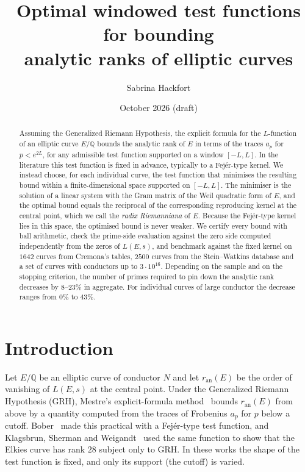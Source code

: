 \documentclass[11pt]{amsart}
\title[Optimal windowed test functions for analytic rank bounds]{Optimal windowed test functions for bounding\\ analytic ranks of elliptic curves}
\author{Sabrina Hackfort}
\date{October 2026 \quad (draft)}
\theoremstyle{remark}
\theoremstyle{definition}
\newcommand{\Q}{\mathbb{Q}}
\newcommand{\ran}{r_{\mathrm{an}}}
\begin{document}
\begin{abstract}
Assuming the Generalized Riemann Hypothesis, the explicit formula for the $L$-function of an elliptic curve $E/\Q$ bounds the analytic rank of $E$ in terms of the traces $a_p$ for $p < e^{2L}$, for any admissible test function supported on a window $[-L,L]$. In the literature this test function is fixed in advance, typically to a Fej\'er-type kernel. We instead choose, for each individual curve, the test function that minimises the resulting bound within a finite-dimensional space supported on $[-L,L]$. The minimiser is the solution of a linear system with the Gram matrix of the Weil quadratic form of $E$, and the optimal bound equals the reciprocal of the corresponding reproducing kernel at the central point, which we call the \emph{radix Riemanniana} of $E$. Because the Fej\'er-type kernel lies in this space, the optimised bound is never weaker. We certify every bound with ball arithmetic, check the prime-side evaluation against the zero side computed independently from the zeros of $L(E,s)$, and benchmark against the fixed kernel on $1642$ curves from Cremona's tables, $2500$ curves from the Stein--Watkins database and a set of curves with conductors up to $3\cdot 10^{16}$. Depending on the sample and on the stopping criterion, the number of primes required to pin down the analytic rank decreases by $8$--$23\%$ in aggregate. For individual curves of large conductor the decrease ranges from $0\%$ to $43\%$.
\end{abstract}

\maketitle

\section{Introduction}

Let $E/\Q$ be an elliptic curve of conductor $N$ and let $\ran(E)$ be the order of vanishing of $L(E,s)$ at the central point. Under the Generalized Riemann Hypothesis (GRH), Mestre's explicit-formula method~\cite{Mestre} bounds $\ran(E)$ from above by a quantity computed from the traces of Frobenius $a_p$ for $p$ below a cutoff. Bober~\cite{Bober} made this practical with a Fej\'er-type test function, and Klagsbrun, Sherman and Weigandt~\cite{KSW} used the same function to show that the Elkies curve has rank $28$ subject only to GRH. In these works the shape of the test function is fixed, and only its support (the cutoff) is varied.
\end{document}
